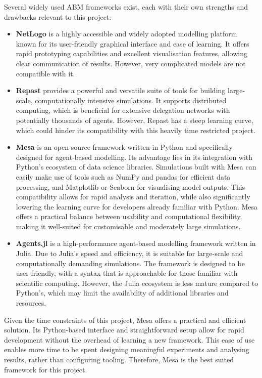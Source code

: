 Several widely used ABM frameworks exist, each with their own strengths and drawbacks relevant to this project:
\begin{itemize}
    \item \textbf{NetLogo} \citep{netlogo} is a highly accessible and widely adopted modelling platform known for its user-friendly graphical interface and ease of learning. It offers rapid prototyping capabilities and excellent visualisation features, allowing clear communication of results. However, very complicated models are not compatible with it.
    \item \textbf{Repast} \citep{repast} provides a powerful and versatile suite of tools for building large-scale, computationally intensive simulations. It supports distributed computing, which is beneficial for extensive delegation networks with potentially thousands of agents. However, Repast has a steep learning curve, which could hinder its compatibility with this heavily time restricted project.
    \item \textbf{Mesa} \citep{kazil_utilizing_2020} is an open-source framework written in Python and specifically designed for agent-based modelling. Its advantage lies in its integration with Python's ecosystem of data science libraries. Simulations built with Mesa can easily make use of tools such as NumPy and pandas for efficient data processing, and Matplotlib or Seaborn for visualising model outputs. This compatibility allows for rapid analysis and iteration, while also significantly lowering the learning curve for developers already familiar with Python. Mesa offers a practical balance between usability and computational flexibility, making it well-suited for customisable and moderately large simulations.
    \item \textbf{Agents.jl} \citep{agentsjl} is a high-performance agent-based modelling framework written in Julia. Due to Julia's speed and efficiency, it is suitable for large-scale and computationally demanding simulations. The framework is designed to be user-friendly, with a syntax that is approachable for those familiar with scientific computing. However, the Julia ecosystem is less mature compared to Python's, which may limit the availability of additional libraries and resources. 
\end{itemize}
Given the time constraints of this project, Mesa offers a practical and efficient solution. Its Python-based interface and straightforward setup allow for rapid development without the overhead of learning a new framework. This ease of use enables more time to be spent designing meaningful experiments and analysing results, rather than configuring tooling. Therefore, Mesa is the best suited framework for this project.

